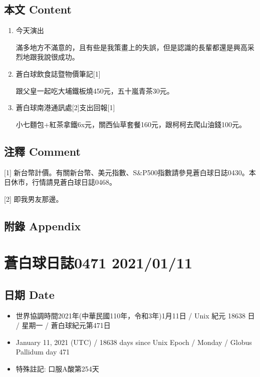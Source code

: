 \documentclass[a5paper, 10pt
]{book}
\providecommand{\tightlist}{%
  \setlength{\itemsep}{0pt}\setlength{\parskip}{0pt}}
\begin{document}
\hypertarget{ux672cux6587-content-40}{%
\subsection{本文 Content}\label{ux672cux6587-content-40}}

\begin{enumerate}
\def\labelenumi{\arabic{enumi}.}
\item
  今天演出

  滿多地方不滿意的，且有些是我策畫上的失誤，但是認識的長輩都還是興高采烈地跟我說很成功。
\item
  蒼白球飲食誌暨物價筆記{[}1{]}

  跟父皇一起吃大埔鐵板燒450元，五十嵐青茶30元。
\item
  蒼白球南港通訊處{[}2{]}支出回報{[}1{]}

  小七麵包+紅茶拿鐵6x元，關西仙草套餐160元，跟柯柯去爬山油錢100元。
\end{enumerate}

\hypertarget{ux6ce8ux91cb-comment-40}{%
\subsection{注釋 Comment}\label{ux6ce8ux91cb-comment-40}}

{[}1{]}
新台幣計價。有關新台幣、美元指數、S\&P500指數請參見蒼白球日誌0430。本日休市，行情請見蒼白球日誌0468。

{[}2{]} 即我男友那邊。

\hypertarget{ux9644ux9304-appendix-40}{%
\subsection{附錄 Appendix}\label{ux9644ux9304-appendix-40}}

\hypertarget{ux84bcux767dux7403ux65e5ux8a8c0471-20210111}{%
\section{蒼白球日誌0471
2021/01/11}\label{ux84bcux767dux7403ux65e5ux8a8c0471-20210111}}

\hypertarget{ux65e5ux671f-date-41}{%
\subsection{日期 Date}\label{ux65e5ux671f-date-41}}

\begin{itemize}
\tightlist
\item
  世界協調時間2021年(中華民國110年，令和3年)1月11日 / Unix 紀元 18638 日
  / 星期一 / 蒼白球紀元第471日
\item
  January 11, 2021 (UTC) / 18638 days since Unix Epoch / Monday / Globus
  Pallidum day 471
\item
  特殊註記: 口服A酸第254天
\end{itemize}
\end{document}
